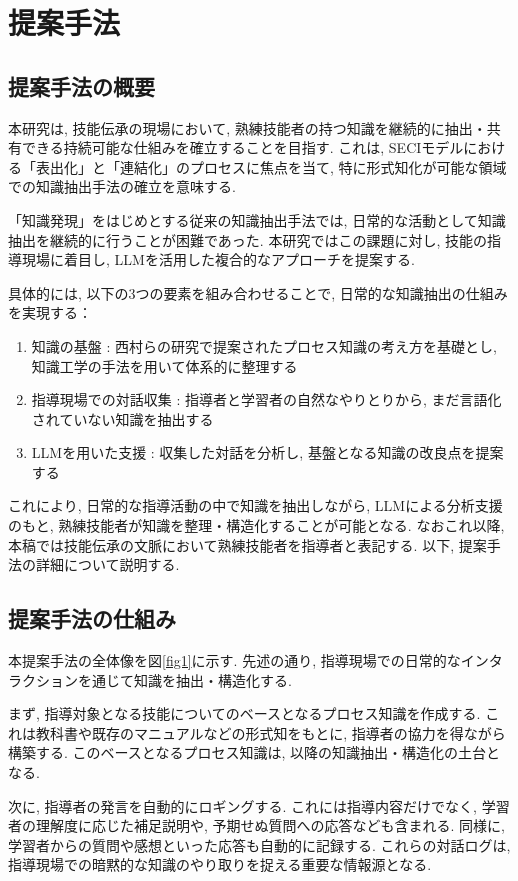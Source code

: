 \chapter{提案手法}
\section{提案手法の概要}
本研究は, 技能伝承の現場において, 熟練技能者の持つ知識を継続的に抽出・共有できる持続可能な仕組みを確立することを目指す. これは, SECIモデルにおける「表出化」と「連結化」のプロセスに焦点を当て, 特に形式知化が可能な領域での知識抽出手法の確立を意味する.

「知識発現」\cite{Nishimura2017}をはじめとする従来の知識抽出手法では, 日常的な活動として知識抽出を継続的に行うことが困難であった. 本研究ではこの課題に対し, 技能の指導現場に着目し, LLMを活用した複合的なアプローチを提案する. 

具体的には, 以下の3つの要素を組み合わせることで, 日常的な知識抽出の仕組みを実現する：
\begin{enumerate}
    \item 知識の基盤 : 西村らの研究で提案されたプロセス知識の考え方を基礎とし, 知識工学の手法を用いて体系的に整理する
    \item 指導現場での対話収集 : 指導者と学習者の自然なやりとりから, まだ言語化されていない知識を抽出する
    \item LLMを用いた支援 : 収集した対話を分析し, 基盤となる知識の改良点を提案する
\end{enumerate}

これにより, 日常的な指導活動の中で知識を抽出しながら, LLMによる分析支援のもと, 熟練技能者が知識を整理・構造化することが可能となる. なおこれ以降, 本稿では技能伝承の文脈において熟練技能者を指導者と表記する. 以下, 提案手法の詳細について説明する.

\section{提案手法の仕組み}
本提案手法の全体像を図\ref{fig1}に示す. 先述の通り, 指導現場での日常的なインタラクションを通じて知識を抽出・構造化する.

まず, 指導対象となる技能についてのベースとなるプロセス知識を作成する. これは教科書や既存のマニュアルなどの形式知をもとに, 指導者の協力を得ながら構築する. このベースとなるプロセス知識は, 以降の知識抽出・構造化の土台となる. 

次に, 指導者の発言を自動的にロギングする. これには指導内容だけでなく, 学習者の理解度に応じた補足説明や, 予期せぬ質問への応答なども含まれる. 同様に, 学習者からの質問や感想といった応答も自動的に記録する. これらの対話ログは, 指導現場での暗黙的な知識のやり取りを捉える重要な情報源となる. 

